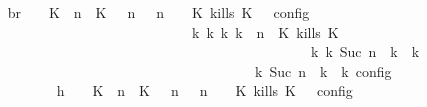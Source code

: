 \begin{isabellebody}
\ \isamarkupfalse%
\ br{}{\isacharcolon}\ {\isacartoucheopen}{\isasymrho}\ {\isasymin}\ {\isasymlbrakk}\ {\isacharparenleft}{\isacharparenleft}K\ {\isasymUp}\ n{\isacharparenright}\ {\isacharhash}\ {\isacharparenleft}K\ {\isasymnot}{\isasymUp}\ {\isasymge}\ n{\isacharparenright}\ {\isacharhash}\ {\isasymGamma}{\isacharparenright}{\isacharcomma}\ n\ {\isasymturnstile}\ {\isasymPsi}\ {\isasymtriangleright}\ {\isacharparenleft}{\isacharparenleft}K\ kills\ K\ {\isacharhash}\ {\isasymPhi}{\isacharparenright}\ {\isasymrbrakk}\isactrlsub c\isactrlsub o\isactrlsub n\isactrlsub f\isactrlsub i\isactrlsub g\isanewline
\ \ \ \ \ \ \ \ \ \ \ \ \ \ \ \ \ \ \ \ \ \ \ \ \ \ \ \ {\isasymLongrightarrow}\ {\isasymexists}{\isasymGamma}\isactrlsub k\ {\isasymPsi}\isactrlsub k\ {\isasymPhi}\isactrlsub k\ k{\isachardot}\ {\isacharparenleft}{\isacharparenleft}{\isasymGamma}{\isacharcomma}\ n\ {\isasymturnstile}\ {\isacharparenleft}{\isacharparenleft}K\ kills\ K\ {\isacharhash}\ {\isasymPsi}{\isacharparenright}\ {\isasymtriangleright}\ {\isasymPhi}{\isacharparenright}\isanewline
\ \ \ \ \ \ \ \ \ \ \ \ \ \ \ \ \ \ \ \ \ \ \ \ \ \ \ \ \ \ \ \ \ \ \ \ \ \ \ \ \ \ \ \ \ \ {\isasymhookrightarrow}\isactrlbsup k\isactrlesup \ {\isacharparenleft}{\isasymGamma}\isactrlsub k{\isacharcomma}\ Suc\ n\ {\isasymturnstile}\ {\isasymPsi}\isactrlsub k\ {\isasymtriangleright}\ {\isasymPhi}\isactrlsub k{\isacharparenright}{\isacharparenright}\isanewline
\ \ \ \ \ \ \ \ \ \ \ \ \ \ \ \ \ \ \ \ \ \ \ \ \ \ \ \ \ \ \ \ \ \ {\isasymand}\ {\isasymrho}\ {\isasymin}\ {\isasymlbrakk}\ {\isasymGamma}\isactrlsub k{\isacharcomma}\ Suc\ n\ {\isasymturnstile}\ {\isasymPsi}\isactrlsub k\ {\isasymtriangleright}\ {\isasymPhi}\isactrlsub k\ {\isasymrbrakk}\isactrlsub c\isactrlsub o\isactrlsub n\isactrlsub f\isactrlsub i\isactrlsub g{\isacartoucheclose}\isanewline
\ \ \ \ \ \ \isamarkupfalse%
\ {\isacharminus}\isanewline
\ \ \ \ \ \ \ \ \isamarkupfalse%
\ h{}{\isacharcolon}\ {\isacartoucheopen}{\isasymrho}\ {\isasymin}\ {\isasymlbrakk}\ {\isacharparenleft}{\isacharparenleft}K\ {\isasymUp}\ n{\isacharparenright}\ {\isacharhash}\ {\isacharparenleft}K\ {\isasymnot}{\isasymUp}\ {\isasymge}\ n{\isacharparenright}\ {\isacharhash}\ {\isasymGamma}{\isacharparenright}{\isacharcomma}\ n\ {\isasymturnstile}\ {\isasymPsi}\ {\isasymtriangleright}\ {\isacharparenleft}{\isacharparenleft}K\ kills\ K\ {\isacharhash}\ {\isasymPhi}{\isacharparenright}\ {\isasymrbrakk}\isactrlsub c\isactrlsub o\isactrlsub n\isactrlsub f\isactrlsub i\isactrlsub g{\isacartoucheclose}\isanewline

\end{isabellebody}
